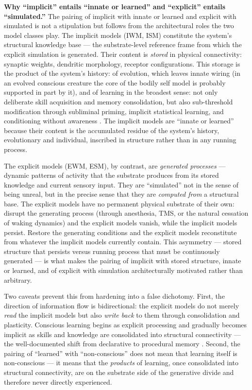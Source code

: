 \documentclass[12pt]{article}
\newcommand{\revstart}{}
\begin{document}
{\revstart\textbf{Why ``implicit'' entails ``innate or learned'' and ``explicit'' entails ``simulated.''} The pairing of implicit with innate or learned and explicit with simulated is not a stipulation but follows from the architectural roles the two model classes play. The implicit models (IWM, ISM) constitute the system's structural knowledge base --- the substrate-level reference frame from which the explicit simulation is generated. Their content is \emph{stored} in physical connectivity: synaptic weights, dendritic morphology, receptor configurations. This storage is the product of the system's history: of evolution, which leaves innate wiring (in an evolved conscious creature the core of the bodily self model is probably supported in part by it), and of learning in the broadest sense: not only deliberate skill acquisition and memory consolidation, but also sub-threshold modification through subliminal priming, implicit statistical learning, and conditioning without awareness \citep{Reber1967,FiserAslin2001,OhmanMineka2001}. The implicit models are ``innate or learned'' because their content is the accumulated residue of the system's history, evolutionary and individual, inscribed in structure rather than in any running process.

The explicit models (EWM, ESM), by contrast, are \emph{generated processes} --- dynamic patterns of activity that the substrate produces from its stored knowledge and current sensory input. They are ``simulated'' not in the sense of being unreal, but in the precise sense that they are \emph{computed from} a structural base. The explicit models have no permanent physical substrate of their own: disrupt the generating process (through anesthesia, TMS, or the natural cessation of waking dynamics) and the explicit models vanish, while the implicit models persist. Restore the generating conditions and the explicit models reconstitute from whatever the implicit models currently contain. This asymmetry --- stored structure that persists versus running process that must be continuously generated --- is what makes the pairing of implicit with stored structure, innate or learned, and of explicit with simulation architecturally motivated rather than arbitrary.

Two caveats prevent this from hardening into a false dichotomy. First, the direction of information flow is bidirectional: the explicit models do not merely \emph{read} the implicit models but also \emph{write back} to them through consolidation and plasticity. Conscious learning begins as explicit processing and gradually becomes implicit as skills and knowledge are consolidated into structural connectivity --- the well-documented shift from declarative to procedural memory \citep{Squire2004}. Second, the pairing of ``learned'' with ``non-conscious'' does not mean that learning itself is non-conscious --- it means that the \emph{products} of learning, once consolidated into structural connectivity, are on the substrate side of the generative divide and therefore never directly experienced.

}
\end{document}
